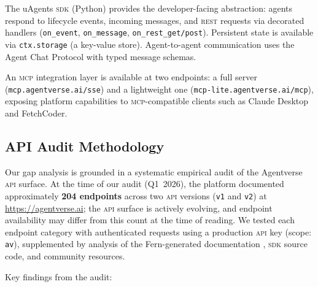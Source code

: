 \documentclass[twoside,11pt]{article}
\begin{document}
The uAgents \textsc{sdk} (Python) \citep{uagents2026sdk} provides the
developer-facing abstraction: agents respond to lifecycle events,
incoming messages, and \textsc{rest} requests via decorated handlers
(\texttt{on\_event}, \texttt{on\_message}, \texttt{on\_rest\_get/post}).
Persistent state is available via \texttt{ctx.storage} (a key-value store).
Agent-to-agent communication uses the Agent Chat Protocol with typed message
schemas.

An \textsc{mcp} integration layer is available at two endpoints: a full
server (\texttt{mcp.agentverse.\allowbreak{}ai/sse}) and a lightweight one
(\texttt{mcp-lite.\allowbreak{}agentverse.ai/mcp}), exposing platform
capabilities to \textsc{mcp}-compatible clients such as Claude Desktop
and FetchCoder.

\subsection{API Audit Methodology}
\label{subsec:audit}

Our gap analysis is grounded in a systematic empirical audit of the Agentverse
\textsc{api} surface.  At the time of our audit (Q1~2026), the platform
documented approximately \textbf{204 endpoints} across two \textsc{api}
versions (\texttt{v1} and \texttt{v2}) at \url{https://agentverse.ai};
the \textsc{api} surface is actively evolving, and endpoint availability may
differ from this count at the time of reading.  We tested each endpoint category with authenticated requests using a
production \textsc{api} key (scope: \texttt{av}), supplemented by analysis of
the Fern-generated documentation \citep{agentverse2026docs}, \textsc{sdk}
source code, and community resources.

Key findings from the audit:
\end{document}
